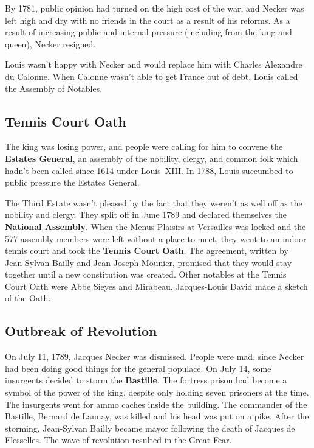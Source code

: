 By 1781, public opinion had turned on the high cost of the war,
and Necker was left high and dry with no friends in the court as a result of his reforms.
As a result of increasing public and internal pressure (including from the king and queen),
Necker resigned.

Louis wasn't happy with Necker and would replace him with Charles Alexandre du Calonne.
When Calonne wasn't able to get France out of debt, Louis called the Assembly of Notables.

\subsection*{Tennis Court Oath}

The king was losing power, and people were calling for him to convene the \textbf{Estates General},
an assembly of the nobility, clergy, and common folk
which hadn't been called since 1614 under Louis~XIII\@.
In 1788, Louis succumbed to public pressure the Estates General.

The Third Estate wasn't pleased by the fact
that they weren't as well off as the nobility and clergy.
They split off in June 1789 and declared themselves the \textbf{National Assembly}.
When the Menus Plaisirs at Versailles was locked
and the 577 assembly members were left without a place to meet,
they went to an indoor tennis court and took the \textbf{Tennis Court Oath}.
The agreement, written by Jean-Sylvan Bailly and Jean-Joseph Mounier,
promised that they would stay together until a new constitution was created.
Other notables at the Tennis Court Oath were Abbe Sieyes and Mirabeau.
Jacques-Louis David made a sketch of the Oath.

\subsection*{Outbreak of Revolution}

On July 11, 1789, Jacques Necker was dismissed.
People were mad, since Necker had been doing good things for the general populace.
On July 14, some insurgents decided to storm the \textbf{Bastille}.
The fortress prison had become a symbol of the power of the king,
despite only holding seven prisoners at the time.
The insurgents went for ammo caches inside the building.
The commander of the Bastille, Bernard de Launay, was killed and his head was put on a pike.
After the storming, Jean-Sylvan Bailly became mayor following the death of Jacques de Flesselles.
The wave of revolution resulted in the Great Fear.

